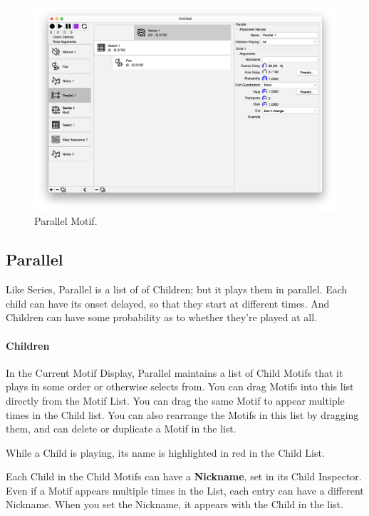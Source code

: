 \documentclass[twoside,10pt]{article}
\begin{document}
\clearpage

\begin{figure}[t]
\centering
\includegraphics[width=6.5in]{Parallel}
\vspace{-2em}
\caption{Parallel Motif.}
\label{parallel}
\end{figure}

\subsection{Parallel}

Like Series, Parallel is a list of of Children; but it plays them in parallel.  Each child can have its onset delayed, so that they start at different times.  And Children can have some probability as to whether they're played at all.

\paragraph{Children}

In the Current Motif Display, Parallel maintains a list of Child Motifs that it plays in some order or otherwise selects from.  You can drag Motifs into this list directly from the Motif List.  You can drag the same Motif to appear multiple times in the Child list.  You can also rearrange the Motifs in this list by dragging them, and can delete or duplicate a Motif in the list.

While a Child is playing, its name is highlighted in red in the Child List.

Each Child in the Child Motifs can have a {\bf Nickname}, set in its Child Inspector.  Even if a Motif appears multiple times in the List, each entry can have a different Nickname.  When you set the Nickname, it appears with the Child in the list.
\end{document}
